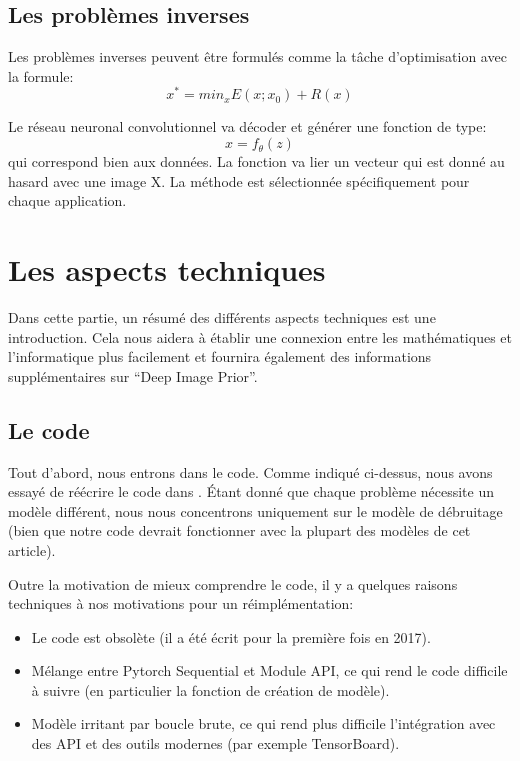 \documentclass[
  11pt,
  dvipsnames]{article}
\providecommand{\tightlist}{%
  \setlength{\itemsep}{0pt}\setlength{\parskip}{0pt}}
\begin{document}
\hypertarget{les-probluxe8mes-inverses}{%
\subsection{Les problèmes inverses}\label{les-probluxe8mes-inverses}}

Les problèmes inverses peuvent être formulés comme la tâche d'optimisation avec la formule:
\[x^* = min_{x}E(x;x_{0}) + R(x)\]

Le réseau neuronal convolutionnel va décoder et générer une fonction de type:
\[x = f_{\theta}(z)\]
qui correspond bien aux données. La fonction va lier un vecteur qui est donné au hasard avec une image X. La méthode est sélectionnée spécifiquement pour chaque application.

\hypertarget{les-aspects-techniques}{%
\section{Les aspects techniques}\label{les-aspects-techniques}}

Dans cette partie, un résumé des différents aspects techniques est une introduction. Cela nous aidera à établir une connexion entre les mathématiques et l'informatique plus facilement et fournira également des informations supplémentaires sur ``Deep Image Prior''.

\hypertarget{le-code}{%
\subsection{Le code}\label{le-code}}

Tout d'abord, nous entrons dans le code. Comme indiqué ci-dessus, nous avons essayé de réécrire le code dans \autocite{1711.10925}. Étant donné que chaque problème nécessite un modèle différent, nous nous concentrons uniquement sur le modèle de débruitage (bien que notre code devrait fonctionner avec la plupart des modèles de cet article).

Outre la motivation de mieux comprendre le code, il y a quelques raisons techniques à nos motivations pour un réimplémentation:

\begin{itemize}
\tightlist
\item
  Le code est obsolète (il a été écrit pour la première fois en 2017).
\item
  Mélange entre Pytorch Sequential et Module API, ce qui rend le code difficile à suivre (en particulier la fonction de création de modèle).
\item
  Modèle irritant par boucle brute, ce qui rend plus difficile l'intégration avec des API et des outils modernes (par exemple TensorBoard).
\end{itemize}
\end{document}
